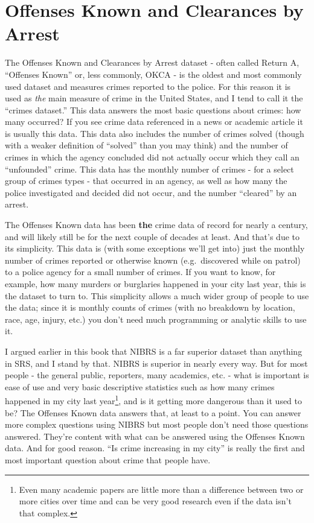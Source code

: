 \documentclass[
]{krantz}
\begin{document}
\chapter{Offenses Known and Clearances by
Arrest}\label{offensesKnown}

The Offenses Known and Clearances by Arrest dataset - often
called Return A, ``Offenses Known'' or, less commonly, OKCA
- is the oldest and most commonly used dataset and measures
crimes reported to the police. For this reason it is used as
\emph{the} main measure of crime in the United States, and I
tend to call it the ``crimes dataset.'' This data answers
the most basic questions about crimes: how many occurred? If
you see crime data referenced in a news or academic article
it is usually this data. This data also includes the number
of crimes solved (though with a weaker definition of
``solved'' than you may think) and the number of crimes in
which the agency concluded did not actually occur which they
call an ``unfounded'' crime. This data has the monthly
number of crimes - for a select group of crimes types - that
occurred in an agency, as well as how many the police
investigated and decided did not occur, and the number
``cleared'' by an arrest.

The Offenses Known data has been \textbf{the} crime data of
record for nearly a century, and will likely still be for
the next couple of decades at least. And that's due to its
simplicity. This data is (with some exceptions we'll get
into) just the monthly number of crimes reported or
otherwise known (e.g.~discovered while on patrol) to a
police agency for a small number of crimes. If you want to
know, for example, how many murders or burglaries happened
in your city last year, this is the dataset to turn to. This
simplicity allows a much wider group of people to use the
data; since it is monthly counts of crimes (with no
breakdown by location, race, age, injury, etc.) you don't
need much programming or analytic skills to use it.

I argued earlier in this book that NIBRS is a far superior
dataset than anything in SRS, and I stand by that. NIBRS is
superior in nearly every way. But for most people - the
general public, reporters, many academics, etc. - what is
important is ease of use and very basic descriptive
statistics such as how many crimes happened in my city last
year\footnote{Even many academic papers are little more than
  a difference between two or more cities over time and can
  be very good research even if the data isn't that complex.},
and is it getting more dangerous than it used to be? The
Offenses Known data answers that, at least to a point. You
can answer more complex questions using NIBRS but most
people don't need those questions answered. They're content
with what can be answered using the Offenses Known data. And
for good reason. ``Is crime increasing in my city'' is
really the first and most important question about crime
that people have.
\end{document}
